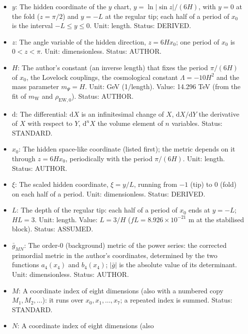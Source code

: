 \documentclass[
  10pt,
]{article}
\providecommand{\tightlist}{%
  \setlength{\itemsep}{0pt}\setlength{\parskip}{0pt}}
\begin{document}
\begin{itemize}
\tightlist
\item
  \(y\): The hidden coordinate of the \(y\) chart,
  \(y = \ln\lvert\sin z\rvert/(6H)\), with \(y = 0\) at the fold
  (\(z = \pi/2\)) and \(y = -L\) at the regular tip; each half of a
  period of \(x_0\) is the interval \(-L \le y \le 0\). Unit: length.
  Status: DERIVED.
\item
  \(z\): The angle variable of the hidden direction, \(z = 6Hx_0\); one
  period of \(x_0\) is \(0 < z < \pi\). Unit: dimensionless. Status:
  AUTHOR.
\item
  \(H\): The author's constant (an inverse length) that fixes the period
  \(\pi/(6H)\) of \(x_0\), the Lovelock couplings, the cosmological
  constant \(\Lambda = -10H^2\) and the mass parameter \(m_\Psi = H\).
  Unit: GeV (1/length). Value: 14.296 TeV (from the fit of
  \(m_{\mathrm{W}}\) and \(\rho_{\mathrm{EW},0}\)). Status: AUTHOR.
\item
  \(\mathrm{d}\): The differential: \(\mathrm{d}X\) is an infinitesimal
  change of \(X\), \(\mathrm{d}X/\mathrm{d}Y\) the derivative of \(X\)
  with respect to \(Y\), \(\mathrm{d}^nX\) the volume element of \(n\)
  variables. Status: STANDARD.
\item
  \(x_0\): The hidden space-like coordinate (listed first); the metric
  depends on it through \(z = 6Hx_0\), periodically with the period
  \(\pi/(6H)\). Unit: length. Status: AUTHOR.
\item
  \(\xi\): The scaled hidden coordinate, \(\xi = y/L\), running from
  \(-1\) (tip) to \(0\) (fold) on each half of a period. Unit:
  dimensionless. Status: DERIVED.
\item
  \(L\): The depth of the regular tip: each half of a period of \(x_0\)
  ends at \(y = -L\); \(HL = 3\). Unit: length. Value: \(L = 3/H\)
  (\(fL = 8.926\times10^{-21}\) m at the stabilised block). Status:
  ASSUMED.
\item
  \(\bar g_{MN}\): The order-0 (background) metric of the power series:
  the corrected primordial metric in the author's coordinates,
  determined by the two functions \(a_4(x_4)\) and \(b_4(x_4)\);
  \(\lvert\bar g\rvert\) is the absolute value of its determinant. Unit:
  dimensionless. Status: AUTHOR.
\item
  \(M\): A coordinate index of eight dimensions (also with a numbered
  copy \(M_1, M_2, \dots\)): it runs over \(x_0, x_1, \dots, x_7\); a
  repeated index is summed. Status: STANDARD.
\item
  \(N\): A coordinate index of eight dimensions (also

\end{itemize}
\end{document}
